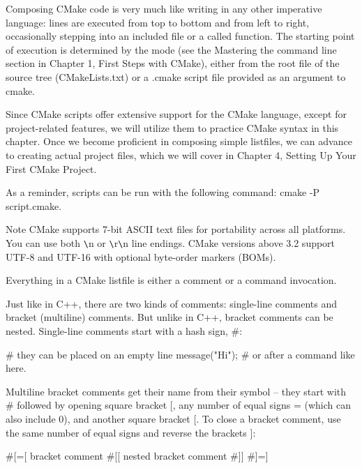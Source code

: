 Composing CMake code is very much like writing in any other imperative language: lines are executed from top to bottom and from left to right, occasionally stepping into an included file or a called function. The starting point of execution is determined by the mode (see the Mastering the command line section in Chapter 1, First Steps with CMake), either from the root file of the source tree (CMakeLists.txt) or a .cmake script file provided as an argument to cmake.

Since CMake scripts offer extensive support for the CMake language, except for project-related features, we will utilize them to practice CMake syntax in this chapter. Once we become proficient in composing simple listfiles, we can advance to creating actual project files, which we will cover in Chapter 4, Setting Up Your First CMake Project.

As a reminder, scripts can be run with the following command: cmake -P script.cmake.

\begin{myNotic}{Note}
CMake supports 7-bit ASCII text files for portability across all platforms. You can use both \verb|\|n or \verb|\|r\verb|\|n line endings. CMake versions above 3.2 support UTF-8 and UTF-16 with optional byte-order markers (BOMs).
\end{myNotic}

Everything in a CMake listfile is either a comment or a command invocation.



Just like in C++, there are two kinds of comments: single-line comments and bracket (multiline) comments. But unlike in C++, bracket comments can be nested. Single-line comments start with a hash sign, \#:

\begin{cmake}
# they can be placed on an empty line
message("Hi"); # or after a command like here.
\end{cmake}

Multiline bracket comments get their name from their symbol – they start with \# followed by opening square bracket [, any number of equal signs = (which can also include 0), and another square bracket [. To close a bracket comment, use the same number of equal signs and reverse the brackets ]:

\begin{cmake}
#[=[
bracket comment
  #[[
    nested bracket comment
  #]]
#]=]
\end{cmake}

